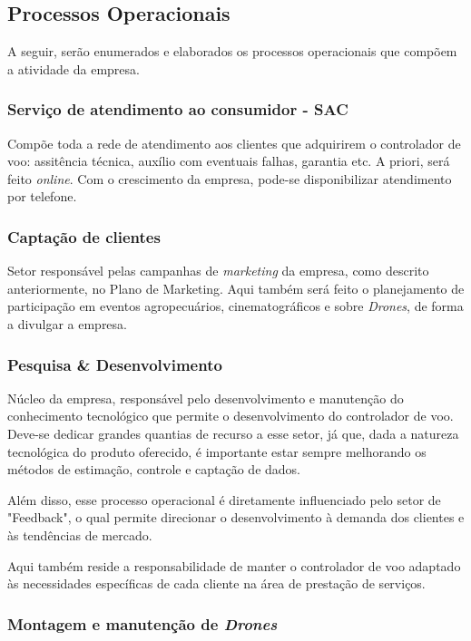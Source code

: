 \subsection{Processos Operacionais}

A seguir, serão enumerados e elaborados os processos 
operacionais que compõem a atividade da empresa.

\subsubsection{Serviço de atendimento ao consumidor - SAC}

Compõe toda a rede de atendimento aos clientes que adquirirem
o controlador de voo: assitência técnica, auxílio com 
eventuais falhas, garantia etc. A priori, será feito \emph{
online}. Com o crescimento da empresa, pode-se disponibilizar
atendimento por telefone.

\subsubsection{Captação de clientes}

Setor responsável pelas campanhas de \emph{marketing} da 
empresa, como descrito anteriormente, no Plano de Marketing.
Aqui também será feito o planejamento de participação em 
eventos agropecuários, cinematográficos e sobre \emph{Drones},
de forma a divulgar a empresa.

\subsubsection{Pesquisa \& Desenvolvimento}

Núcleo da empresa, responsável pelo desenvolvimento e 
manutenção do conhecimento tecnológico que permite o 
desenvolvimento do controlador de voo. Deve-se dedicar grandes
quantias de recurso a esse setor, já que, dada a natureza
tecnológica do produto oferecido, é importante estar sempre
melhorando os métodos de estimação, controle e captação de 
dados.

Além disso, esse processo operacional é diretamente 
influenciado pelo setor de "Feedback", o qual permite 
direcionar o desenvolvimento à demanda dos clientes e às 
tendências de mercado.

Aqui também reside a responsabilidade de manter o controlador
de voo adaptado às necessidades específicas de cada cliente
na área de prestação de serviços.

\subsubsection{Montagem e manutenção de \emph{Drones}}

